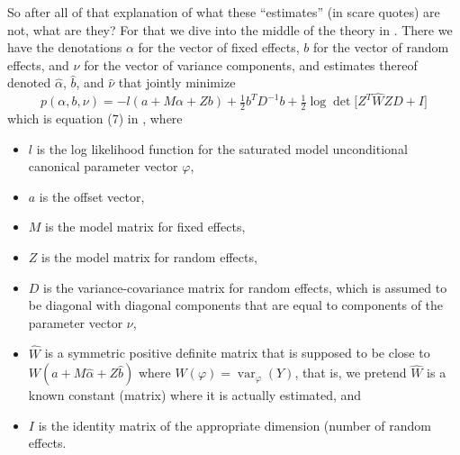 \documentclass[11pt]{article}
\DeclareMathOperator{\var}{var}
\begin{document}
So after all of that explanation of what these ``estimates'' (in scare quotes)
are not, what are they?  For that we dive into the middle of the theory in
\citet[Section~2]{reaster}.  There we have the denotations $\alpha$ for
the vector of fixed effects, $b$ for the vector of random effects,
and $\nu$ for the vector of variance components, and estimates thereof
denoted $\hat{\alpha}$, $\hat{b}$, and $\hat{\nu}$ that jointly minimize
\begin{equation} \label{eq:pee}
   p(\alpha, b, \nu)
   =
   - l(a + M \alpha + Z b)
   + \tfrac{1}{2} b^T D^{-1} b
   + \tfrac{1}{2} \log
   \det\bigl[ Z^T \widehat{W} Z D + I \bigr]
\end{equation}
which is equation (7) in \citet{reaster}, where
\begin{itemize}
\item $l$ is the log likelihood function for the saturated model
    unconditional canonical parameter vector $\varphi$,
\item $a$ is the offset vector,
\item $M$ is the model matrix for fixed effects,
\item $Z$ is the model matrix for random effects,
\item $D$ is the variance-covariance matrix for random effects,
    which is assumed to be diagonal with diagonal components that
    are equal to components of the parameter vector $\nu$,
\item $\widehat{W}$ is a symmetric positive definite matrix that is supposed
    to be close to $W(a + M \hat{\alpha} + Z \hat{b})$
    where $W(\varphi) = \var_\varphi(Y)$, that is, we pretend $\widehat{W}$
    is a known constant (matrix) where it is actually estimated, and
\item $I$ is the identity matrix of the appropriate dimension (number
    of random effects.
\end{itemize}
\end{document}
